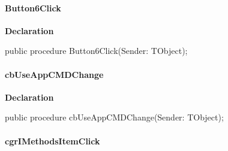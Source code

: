 \documentclass{report}
\newif\ifpdf
\begin{document}
\paragraph*{Button6Click}\hspace*{\fill}

\label{prjwizard.TfrmProjectWizard-Button6Click}
\begin{list}{}{
\setlength{\itemindent}{0cm}
\setlength{\listparindent}{0cm}
\setlength{\leftmargin}{\evensidemargin}
\addtolength{\leftmargin}{\tmplength}
\settowidth{\labelsep}{X}
\addtolength{\leftmargin}{\labelsep}
\setlength{\labelwidth}{\tmplength}
}
\item[\textbf{Declaration}\hfill]
\ifpdf
\begin{flushleft}
\fi
\begin{ttfamily}
public procedure Button6Click(Sender: TObject);\end{ttfamily}

\ifpdf
\end{flushleft}
\fi

\end{list}
\paragraph*{cbUseAppCMDChange}\hspace*{\fill}

\label{prjwizard.TfrmProjectWizard-cbUseAppCMDChange}
\begin{list}{}{
\setlength{\itemindent}{0cm}
\setlength{\listparindent}{0cm}
\setlength{\leftmargin}{\evensidemargin}
\addtolength{\leftmargin}{\tmplength}
\settowidth{\labelsep}{X}
\addtolength{\leftmargin}{\labelsep}
\setlength{\labelwidth}{\tmplength}
}
\item[\textbf{Declaration}\hfill]
\ifpdf
\begin{flushleft}
\fi
\begin{ttfamily}
public procedure cbUseAppCMDChange(Sender: TObject);\end{ttfamily}

\ifpdf
\end{flushleft}
\fi

\end{list}
\paragraph*{cgrIMethodsItemClick}\hspace*{\fill}
\end{document}
